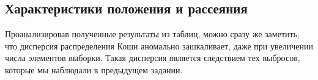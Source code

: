 \subsection{Характеристики положения и рассеяния}
\label{subsec:discuss_table}
Проанализировав полученные результаты из таблиц, можно сразу же заметить, что дисперсия распределения Коши аномально зашкаливает, даже при увеличении числа элементов выборки. Такая дисперсия является следствием тех выбросов, которые мы наблюдали в предыдущем задании.